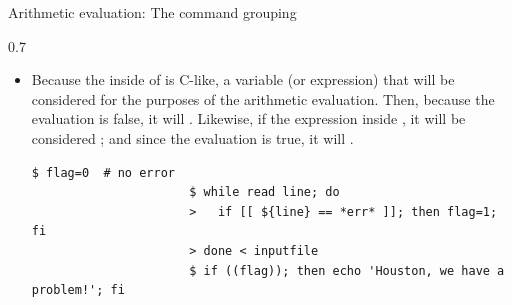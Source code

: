 \begin{frame}[fragile]{Arithmetic evaluation: The command grouping \PB{\texttt{((\ldots))}}}
\begin{overlayarea}{\textwidth}{0.7\textheight}
\begin{itemize}
\begin{lstlisting}[style=MyBash, aboveskip=2mm, belowskip=-6mm, firstnumber=11]
                      > fi
                      |+Blackjack!+|
                  \end{lstlisting}
            \item<only@2> Because the inside of \PB{\texttt{((\ldots))}} is C-like, a variable (or expression) that  will be considered  for the purposes of the arithmetic evaluation.
                  Then, because the evaluation is false, it will .
                  Likewise, if the expression inside \PB{\texttt{((\ldots))}} , it will be considered ; and since the evaluation is true, it will .
                  \begin{lstlisting}[style=MyBash, aboveskip=2mm, belowskip=-6mm, firstnumber=16]
                      $ flag=0  # no error
                      $ while read line; do
                      >   if [[ ${line} == *err* ]]; then flag=1; fi
                      > done < inputfile
                      $ if ((flag)); then echo 'Houston, we have a problem!'; fi
                  \end{lstlisting}
        \end{itemize}
    \end{overlayarea}
\end{frame}


